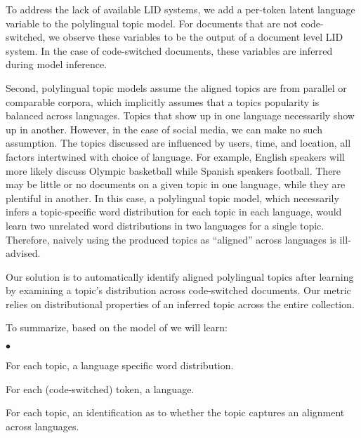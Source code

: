 \documentclass[11pt]{article}
\newcommand{\squishlist}{
 \begin{list}{$\bullet$}
  { \setlength{\itemsep}{0pt}
     \setlength{\parsep}{3pt}
     \setlength{\topsep}{3pt}
     \setlength{\partopsep}{0pt}
     \setlength{\leftmargin}{1.5em}
     \setlength{\labelwidth}{1em}
     \setlength{\labelsep}{0.5em} } }
\newcommand{\squishend}{
  \end{list}  }
\begin{document}

To address the lack of available LID systems, we add a per-token latent language variable to the polylingual topic model.
For documents that are not code-switched, we observe these variables
to be the output of a document level LID system. In the case of code-switched documents,
these variables are inferred during model inference.

Second, polylingual topic models assume the aligned topics are from parallel or comparable corpora, which implicitly
assumes that a topics popularity is balanced across languages. Topics that show up in one language necessarily
show up in another.
However, in the case of social media, we can make no such assumption. The topics discussed are influenced
by users, time, and location, all factors intertwined with choice of language.
For example, English speakers will more likely discuss Olympic basketball while Spanish speakers football.
There may be little or no documents on a given topic in one language, while they are plentiful
in another. In this case, a polylingual topic model, which necessarily infers a topic-specific word distribution for each topic
in each language, would learn two unrelated word distributions in two languages for a single topic.
Therefore, naively using the produced topics as ``aligned'' across languages is ill-advised.

Our solution is to automatically identify aligned polylingual topics after learning by examining a topic's distribution across 
code-switched documents. Our metric relies on distributional properties of an inferred topic across the entire collection.

To summarize, based on the model of  we will learn:
\squishlist
\item For each topic, a language specific word distribution.
\item For each (code-switched) token, a language.
\item For each topic, an identification as to whether the topic captures an alignment across languages.
\squishend
\end{document}
